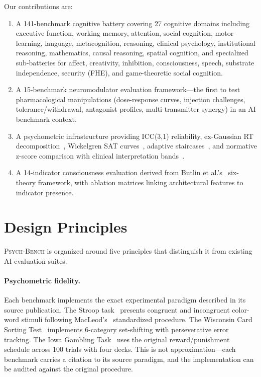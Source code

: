 \documentclass[11pt,letterpaper]{article}
\newcommand{\psychbench}{\textsc{Psych-Bench}}
\begin{document}
Our contributions are:
\begin{enumerate}[nosep]
    \item A 141-benchmark cognitive battery covering 27 cognitive domains including executive function, working memory, attention, social cognition, motor learning, language, metacognition, reasoning, clinical psychology, institutional reasoning, mathematics, causal reasoning, spatial cognition, and specialized sub-batteries for affect, creativity, inhibition, consciousness, speech, substrate independence, security (FHE), and game-theoretic social cognition.
    \item A 15-benchmark neuromodulator evaluation framework---the first to test pharmacological manipulations (dose-response curves, injection challenges, tolerance/withdrawal, antagonist profiles, multi-transmitter synergy) in an AI benchmark context.
    \item A psychometric infrastructure providing ICC(3,1) reliability, ex-Gaussian RT decomposition~\citep{heathcote1996fitting}, Wickelgren SAT curves~\citep{wickelgren1977speed}, adaptive staircases~\citep{levitt1971transformed}, and normative z-score comparison with clinical interpretation bands~\citep{cicchetti1994guidelines}.
    \item A 14-indicator consciousness evaluation derived from Butlin et al.'s~\citep{butlin2023consciousness} six-theory framework, with ablation matrices linking architectural features to indicator presence.
\end{enumerate}

\section{Design Principles}
\label{sec:principles}

\psychbench{} is organized around five principles that distinguish it from existing AI evaluation suites.

\paragraph{Psychometric fidelity.} Each benchmark implements the exact experimental paradigm described in its source publication. The Stroop task~\citep{stroop1935interference} presents congruent and incongruent color-word stimuli following MacLeod's~\citep{macleod1991half} standardized procedure. The Wisconsin Card Sorting Test~\citep{berg1948simple} implements 6-category set-shifting with perseverative error tracking. The Iowa Gambling Task~\citep{bechara1994insensitivity} uses the original reward/punishment schedule across 100 trials with four decks. This is not approximation---each benchmark carries a citation to its source paradigm, and the implementation can be audited against the original procedure.
\end{document}
